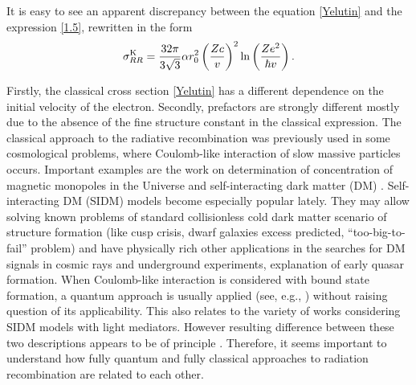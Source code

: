 \documentclass{SovJurn/JETPL}
\begin{document}
It is easy to see an apparent discrepancy between the equation \eqref{Yelutin} and the expression \eqref{1.5}, rewritten in the form
\begin{equation}
\sigma^{\rm K}_{RR}=\frac{32\pi}{3\sqrt{3}}\alpha r^2_0\left(\frac{Zc}{v}\right)^2 \ln\left(\frac{Ze^2}{\hbar v}\right).
\label{Kramers_inegral}
\end{equation}
\par Firstly, the classical cross section \eqref{Yelutin} has a different dependence on the initial velocity of the electron. %
Secondly, prefactors are strongly different mostly due to the absence of the fine structure constant in the classical expression. 
The classical approach to the radiative recombination was previously used in some cosmological problems, where %
Coulomb-like interaction of slow massive particles occurs. Important examples are the work on determination of concentration of magnetic monopoles in the Universe \cite{zeldovich1978concentration} and self-interacting dark matter (DM) \cite{Belotsky_2016, Belotsky:2005dk, Belotsky:2015fuc,Belotsky2017positron,Belotsky:2015rhp,Nazarova:2017xaw}.
Self-interacting DM (SIDM) models become especially popular lately. They may allow solving known problems of standard collisionless cold dark matter scenario of structure formation (like cusp crisis, dwarf galaxies excess predicted, ``too-big-to-fail'' problem) and have physically rich other applications in the searches for DM signals in cosmic rays and underground experiments, explanation of early quasar formation. When Coulomb-like interaction is considered with bound state formation, a quantum approach is usually applied (see, e.g., \cite{Cirelli2017,Petraki2017}) without raising question of its applicability. This also relates to the variety of works considering SIDM models with light mediators. However resulting difference between these two descriptions appears to be of principle \cite{Belotsky_2016}.
Therefore, it seems important to understand how fully quantum and fully classical approaches to radiation recombination are related to each other.
\end{document}
